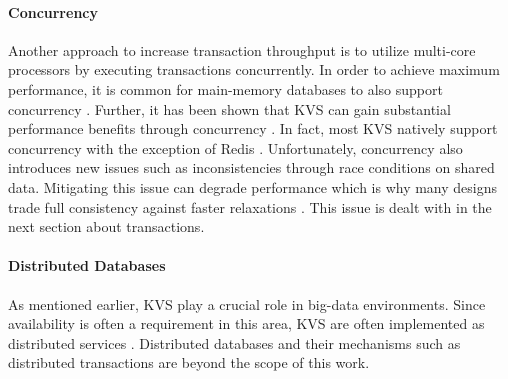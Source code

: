 \paragraph{Concurrency}

Another approach to increase transaction throughput is to utilize multi-core
processors by executing transactions concurrently. In order to achieve maximum
performance, it is common for main-memory databases to also support concurrency
\cite{grund2010hyrise, faerber2012hana, diaconu2013hekaton}. Further, it has
been shown that \ac{KVS} can gain substantial performance benefits through
concurrency \cite{fan2013memc3, li2015architecting, xu2014building}. In fact,
most \ac{KVS} natively support concurrency with the exception of Redis
\cite{redis2017home}. Unfortunately, concurrency also introduces new issues such
as inconsistencies through race conditions on shared data. Mitigating this issue
can degrade performance which is why many designs trade full consistency against
faster relaxations \cite{decandia2007dynamo}. This issue is dealt with in the
next section about transactions.

\paragraph{Distributed Databases}

As mentioned earlier, \ac{KVS} play a crucial role in big-data environments.
Since availability is often a requirement in this area, \ac{KVS} are often
implemented as distributed services \cite{decandia2007dynamo,
lakshman2010cassandra, wang2015hydradb}. Distributed databases and their
mechanisms such as distributed transactions are beyond the scope of this work.
